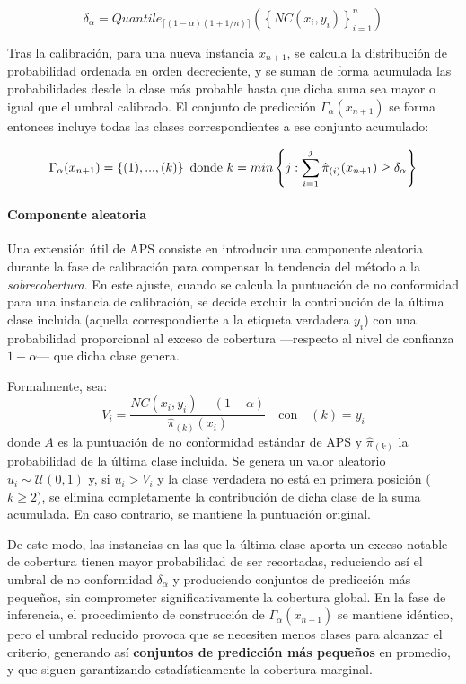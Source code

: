 $$
\delta_\alpha = Quantile_{ \lceil  (1-\alpha) (1 + 1/n)  \rceil } ( \left\{ NC(x_i,y_i) \right\}_{i=1}^n )
$$

Tras la calibración, para una nueva instancia $x_{n+1}$, se calcula la distribución de probabilidad ordenada en orden decreciente, y se suman de forma acumulada las probabilidades desde la clase más probable hasta que dicha suma sea mayor o igual que el umbral calibrado. El conjunto de predicción $\Gamma_\alpha(x_{n+1})$ se forma entonces incluye todas las clases correspondientes a ese conjunto acumulado: 

$$
\Gamma_\alpha(x_{n+1}) = \left\{ (1),...,(k) \right\} \\ \textnormal{ donde } 
k = min\left\{ j: \sum_{i=1}^{j} \hat{\pi}_{(i)}(x_{n+1}) \ge \delta_\alpha \right\} 
$$


\paragraph{Componente aleatoria}

Una extensión útil de \acrshort{APS} consiste en introducir una componente aleatoria durante la fase de calibración para compensar la tendencia del método a la \textit{sobrecobertura}. En este ajuste, cuando se calcula la puntuación de no conformidad para una instancia de calibración, se decide excluir la contribución de la última clase incluida (aquella correspondiente a la etiqueta verdadera $y_i$) con una probabilidad proporcional al exceso de cobertura ---respecto al nivel de confianza $1-\alpha$--- que dicha clase genera.

Formalmente, sea:
$$
V_i = \frac{NC(x_i, y_i) - (1-\alpha)}{\hat{\pi}_{(k)}(x_i)} \quad \text{con} \quad (k) = y_i
$$
donde $A$ es la puntuación de no conformidad estándar de \acrshort{APS} y $\hat{\pi}_{(k)}$ la probabilidad de la última clase incluida. Se genera un valor aleatorio $u_i \sim \mathcal{U}(0,1)$ y, si $u_i > V_i$ y la clase verdadera no está en primera posición ($k \ge 2$), se elimina completamente la contribución de dicha clase de la suma acumulada. En caso contrario, se mantiene la puntuación original.

De este modo, las instancias en las que la última clase aporta un exceso notable de cobertura tienen mayor probabilidad de ser recortadas, reduciendo así el umbral de no conformidad $\delta_\alpha$ y produciendo conjuntos de predicción más pequeños, sin comprometer significativamente la cobertura global. En la fase de inferencia, el procedimiento de construcción de $\Gamma_\alpha(x_{n+1})$ se mantiene idéntico, pero el umbral reducido provoca que se necesiten menos clases para alcanzar el criterio, generando así \textbf{conjuntos de predicción más pequeños} en promedio, y que siguen garantizando estadísticamente la cobertura marginal.

